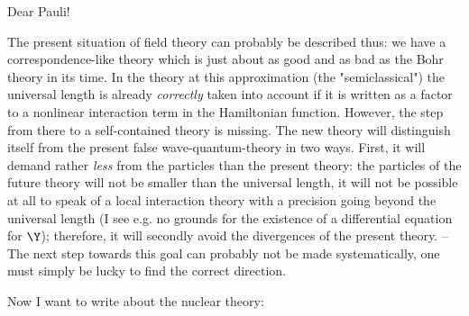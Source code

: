 \date{December 18, 1936}


Dear Pauli!

The present situation of field theory can probably be described thus: we have a correspondence-like theory which is just about as good and as bad as the Bohr theory in its time. In the theory at this approximation (the "semiclassical") the universal length is already \textit{correctly} taken into account if it is written as a factor to a nonlinear interaction term in the Hamiltonian function. However, the step from there to a self-contained theory is missing. The new theory will distinguish itself from the present false wave-quantum-theory in two ways. First, it will demand rather \textit{less} from the particles than the present theory: the particles of the future theory will not be smaller than the universal length, it will not be possible at all to speak of a local interaction theory with a precision going beyond the universal length (I see e.g. no grounds for the existence of a differential equation for $\Y$); therefore, it will secondly avoid the divergences of the present theory. -- The next step towards this goal can probably not be made systematically, one must simply be lucky to find the correct direction.

Now I want to write about the nuclear theory:

